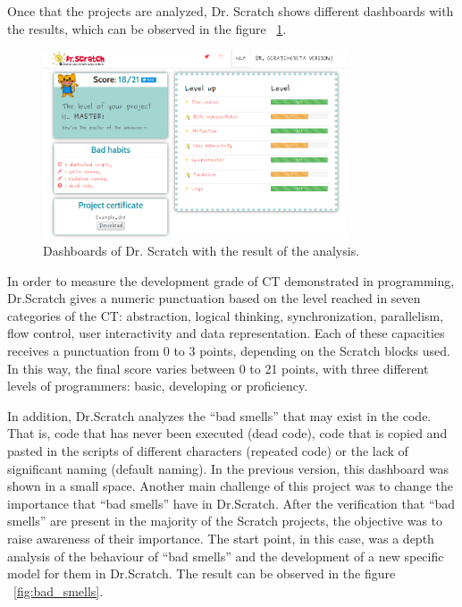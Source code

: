Once that the projects are analyzed, Dr. Scratch shows different dashboards with the results, which can be observed in the figure ~\ref{fig:dashboards}.

\begin{figure}
  \centering
  \includegraphics[width=9cm, keepaspectratio]{img/dashboards.png}
  \caption{Dashboards of Dr. Scratch with the result of the analysis.}
  \label{fig:dashboards}
\end{figure}

In order to measure the development grade of CT demonstrated in programming, Dr.Scratch gives a numeric punctuation based on the level reached in seven categories of the CT: abstraction, logical thinking, synchronization, parallelism, flow control, user interactivity and data representation. Each of these capacities receives a punctuation from 0 to 3 points, depending on the Scratch blocks used. In this way, the final score varies between 0 to 21 points, with three different levels of programmers: basic, developing or proficiency.   

In addition, Dr.Scratch analyzes the ``bad smells'' that may exist in the code. That is, code that has never been executed (dead code), code that is copied and pasted in the scripts of different characters (repeated code) or the lack of significant naming (default naming). In the previous version, this dashboard was shown in a small space. Another main challenge of this project was to change the importance that ``bad smells'' have in Dr.Scratch. After the verification that ``bad smells'' are present in the majority of the Scratch projects, the objective was to raise awareness of their importance. The start point, in this case, was a depth analysis of the behaviour of ``bad smells'' and the development of a new specific model for them in Dr.Scratch. The result can be observed in the figure ~\ref{fig:bad_smells}.

